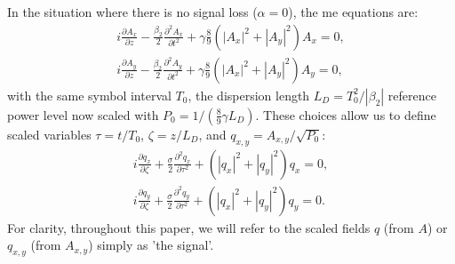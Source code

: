 In the situation where there is no signal loss ($\alpha = 0$), the \Gls{me} equations are:
\begin{gather} 
i \frac{\partial A_x}{\partial z} - \frac{\beta_2}{2}\frac{\partial^2 A_x}{\partial t^2} + \gamma\frac{8}{9}\left(|A_x|^2 + |A_y|^2\right) A_x = 0, \nonumber \\
i \frac{\partial A_y}{\partial z} - \frac{\beta_2}{2}\frac{\partial^2 A_y}{\partial t^2} + \gamma\frac{8}{9}\left(|A_x|^2 + |A_y|^2\right) A_y = 0,
\label{eq:manakov}
\end{gather}
with the same symbol interval \( T_0 \), the dispersion length \( L_D = T_0^2/|\beta_2| \) reference power level now scaled with \( P_0=1/(\frac{8}{9} \gamma L_D) \). These choices allow us to define scaled variables \( \tau=t/T_0 \), \( \zeta=z/L_D \), and \( q_{x,y}=A_{x,y}/\sqrt{P_0} \):
\begin{gather} 
i \frac{\partial q_x}{\partial \zeta} + \frac{\sigma}{2}\frac{\partial^2 q_x}{\partial \tau^2} +  \left(|q_x|^2 + |q_y|^2\right) q_x = 0, \nonumber \\
i \frac{\partial q_y}{\partial \zeta} + \frac{\sigma}{2}\frac{\partial^2 q_y}{\partial \tau^2} + \left(|q_x|^2 + |q_y|^2\right) q_y = 0.
\label{eq:manakov_norm}
\end{gather}
For clarity, throughout this paper, we will refer to the scaled fields \( q \) (from \( A \)) or \( q_{x,y} \) (from \( A_{x,y} \)) simply as 'the signal'.





